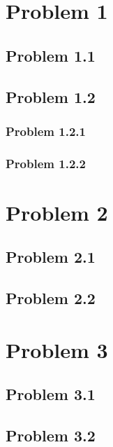 \documentclass[12pt,letterpaper]{article}
\begin{document}
\section*{Problem 1}
\subsection*{Problem 1.1}

\subsection*{Problem 1.2}
\subsubsection*{Problem 1.2.1}

\subsubsection*{Problem 1.2.2}

\section*{Problem 2}
\subsection*{Problem 2.1}

\subsection*{Problem 2.2}

\section*{Problem 3}
\subsection*{Problem 3.1}

\subsection*{Problem 3.2}

%
\end{document}
